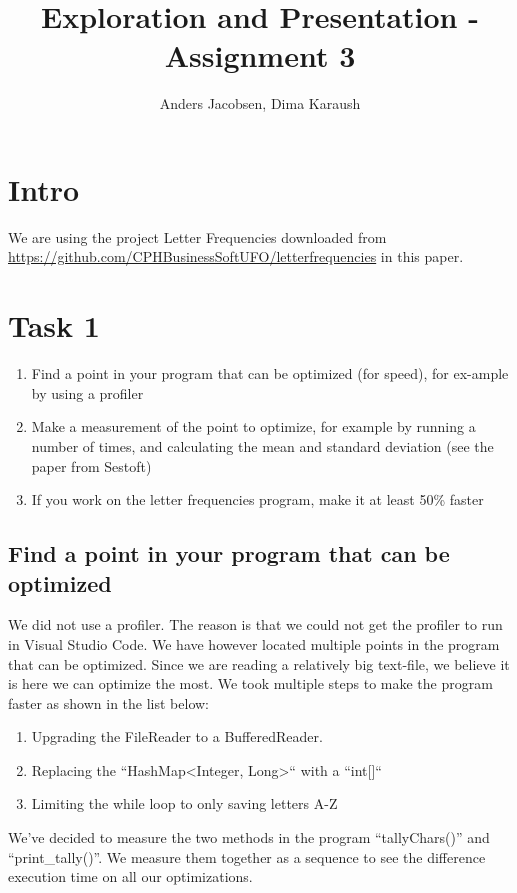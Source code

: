 \documentclass{article}
\author{Anders Jacobsen, Dima Karaush}
\title{Exploration and Presentation - Assignment 3}
\begin{document}
\maketitle

\newpage
\tableofcontents

\newpage
\section*{Intro}
We are using the project Letter Frequencies downloaded 
from \url{https://github.com/CPHBusinessSoftUFO/letterfrequencies} 
in this paper. 

\section{Task 1}
\begin{enumerate}
    \item Find a point in your program that can be optimized (for speed), 
    for ex-ample by using a profiler
    \item Make a measurement of the point to optimize, for example by 
    running a number of times, and calculating the mean and standard 
    deviation (see the paper from Sestoft)
    \item If you work on the letter frequencies program, make it at least 50\% faster
\end{enumerate}

\subsection{Find a point in your program that can be optimized}
We did not use a profiler. The reason is that we could not get 
the profiler to run in Visual Studio Code. We have however located 
multiple points in the program that can be optimized. Since we are 
reading a relatively big text-file, we believe it is here we can 
optimize the most. We took multiple steps to make the program faster
as shown in the list below:
\begin{enumerate}
    \item Upgrading the FileReader to a BufferedReader.
    \item Replacing the ``HashMap\textless Integer, Long\textgreater`` with a ``int[]``
    \item Limiting the while loop to only saving letters A-Z
\end{enumerate}
We've decided to measure the two methods in the program ``tallyChars()'' and ``print\_tally()''. 
We measure them together as a sequence to see the difference execution time on all our optimizations.  
\end{document}
